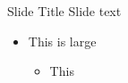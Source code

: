 \documentclass{beamer}
\begin{document}
\begin{frame}{Slide Title}
  Slide text
    \begin{itemize}
      \item This is large
      \begin{itemize}
      \item This
      \end{itemize}
    \end{itemize}
\end{frame}
\end{document}
